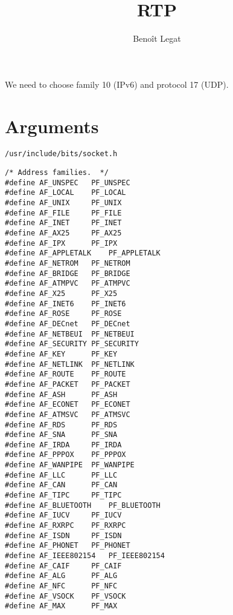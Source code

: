 \documentclass{article}
\author{Benoît Legat}
\title{RTP}
\begin{document}
\maketitle

\appendix

We need to choose family 10 (IPv6) and protocol 17 (UDP).

\section{Arguments}
\lstinline+/usr/include/bits/socket.h+
\begin{lstlisting}
/* Address families.  */
#define	AF_UNSPEC	PF_UNSPEC
#define	AF_LOCAL	PF_LOCAL
#define	AF_UNIX		PF_UNIX
#define	AF_FILE		PF_FILE
#define	AF_INET		PF_INET
#define	AF_AX25		PF_AX25
#define	AF_IPX		PF_IPX
#define	AF_APPLETALK	PF_APPLETALK
#define	AF_NETROM	PF_NETROM
#define	AF_BRIDGE	PF_BRIDGE
#define	AF_ATMPVC	PF_ATMPVC
#define	AF_X25		PF_X25
#define	AF_INET6	PF_INET6
#define	AF_ROSE		PF_ROSE
#define	AF_DECnet	PF_DECnet
#define	AF_NETBEUI	PF_NETBEUI
#define	AF_SECURITY	PF_SECURITY
#define	AF_KEY		PF_KEY
#define	AF_NETLINK	PF_NETLINK
#define	AF_ROUTE	PF_ROUTE
#define	AF_PACKET	PF_PACKET
#define	AF_ASH		PF_ASH
#define	AF_ECONET	PF_ECONET
#define	AF_ATMSVC	PF_ATMSVC
#define AF_RDS		PF_RDS
#define	AF_SNA		PF_SNA
#define	AF_IRDA		PF_IRDA
#define	AF_PPPOX	PF_PPPOX
#define	AF_WANPIPE	PF_WANPIPE
#define AF_LLC		PF_LLC
#define AF_CAN		PF_CAN
#define AF_TIPC		PF_TIPC
#define	AF_BLUETOOTH	PF_BLUETOOTH
#define	AF_IUCV		PF_IUCV
#define AF_RXRPC	PF_RXRPC
#define AF_ISDN		PF_ISDN
#define AF_PHONET	PF_PHONET
#define AF_IEEE802154	PF_IEEE802154
#define AF_CAIF		PF_CAIF
#define AF_ALG		PF_ALG
#define AF_NFC		PF_NFC
#define AF_VSOCK	PF_VSOCK
#define	AF_MAX		PF_MAX
\end{lstlisting}
\end{document}
